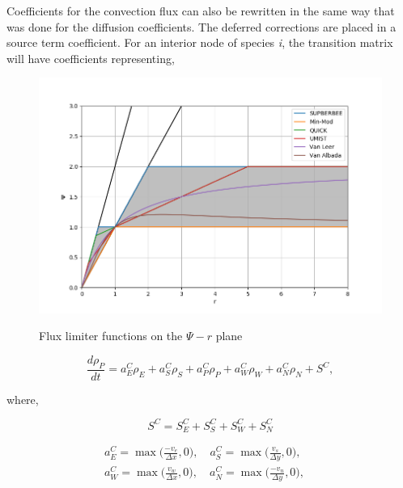Coefficients for the convection flux can also be rewritten in the same way that was done for the diffusion coefficients. The deferred corrections are placed in a source term coefficient. For an interior node of species \textit{i}, the transition matrix will have coefficients representing,

\clearpage

\begin{figure}[p]
  \centering
  \includegraphics[width=5.5in]{images/chapter-4/CFLlimiterFunctions.png}\\
  \caption{Flux limiter functions on the $\Psi - r$ plane}
  \label{fig:fluxlimiter}
\end{figure} 

\clearpage

\begin{equation}
    \frac{d \rho_{P}}{dt} = a^{C}_{E}\rho_{E} + a^{C}_{S}\rho_{S} + a^{C}_{P}\rho_{P} + a^{C}_{W}\rho_{W} + a^{C}_{N}\rho_{N} + S^{C},
\end{equation}

\noindent where,

\begin{equation*}
    S^{C} = S_{E}^{C} + S_{S}^{C} + S_{W}^{C} + S_{N}^{C}
\end{equation*}

\begin{equation*}
\begin{split}
    a^{C}_{E} = \max\bigg(\frac{-v_{e}}{\Delta x}, 0\bigg), \quad 
    a^{C}_{S} = \max\bigg(\frac{v_{s}}{\Delta y}, 0\bigg), \quad \\
    a^{C}_{W} = \max\bigg(\frac{v_{w}}{\Delta x}, 0\bigg), \quad
    a^{C}_{N} = \max\bigg(\frac{-v_{n}}{\Delta y}, 0\bigg), \quad 
\end{split}
\end{equation*}

